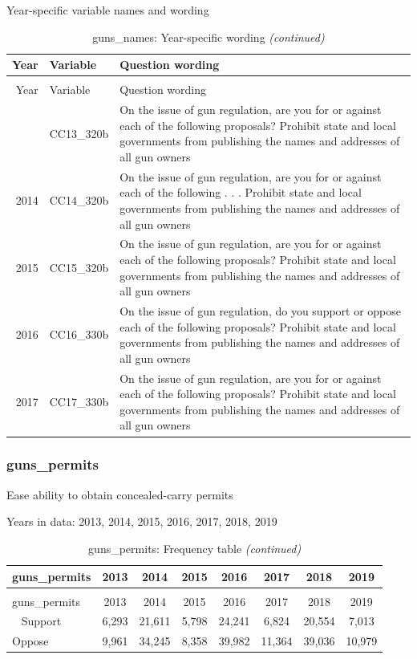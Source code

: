 \documentclass[12pt]{article}
\begin{document}
Year-specific variable names and wording

\begin{longtable}[t]{rl>{\raggedright\arraybackslash}p{10cm}}
\caption{\label{tab:unnamed-chunk-4}guns\_names: Year-specific wording}\\
\toprule
Year & Variable & Question wording\\
\midrule
\endfirsthead
\caption[]{guns\_names: Year-specific wording \textit{(continued)}}\\
\toprule
Year & Variable & Question wording\\
\midrule
\endhead
\
\endfoot
\bottomrule
\endlastfoot
2013 & CC13\_320b & On the issue of gun regulation, are you for or against each of the following proposals? Prohibit state and local governments from publishing the names and addresses of all gun owners\\
2014 & CC14\_320b & On the issue of gun regulation, are you for or against each of the following . . . Prohibit state and local governments from publishing the names and addresses of all gun owners\\
2015 & CC15\_320b & On the issue of gun regulation, are you for or against each of the following proposals? Prohibit state and local governments from publishing the names and addresses of all gun owners\\
2016 & CC16\_330b & On the issue of gun regulation, do you support or oppose each of the following proposals? Prohibit state and local governments from publishing the names and addresses of all gun owners\\
2017 & CC17\_330b & On the issue of gun regulation, are you for or against each of the following proposals? Prohibit state and local governments from publishing the names and addresses of all gun owners\\*
\end{longtable}

\subsubsection{guns\_permits}\label{guns_permits}

Ease ability to obtain concealed-carry permits

Years in data: 2013, 2014, 2015, 2016, 2017, 2018, 2019

\begin{longtable}[t]{lccccccc}
\caption{\label{tab:unnamed-chunk-4}guns\_permits: Frequency table}\\
\toprule
guns\_permits & 2013 & 2014 & 2015 & 2016 & 2017 & 2018 & 2019\\
\midrule
\endfirsthead
\caption[]{guns\_permits: Frequency table \textit{(continued)}}\\
\toprule
guns\_permits & 2013 & 2014 & 2015 & 2016 & 2017 & 2018 & 2019\\
\midrule
\endhead
\
\endfoot
\bottomrule
\endlastfoot
Support & 6,293 & 21,611 & 5,798 & 24,241 & 6,824 & 20,554 & 7,013\\
Oppose & 9,961 & 34,245 & 8,358 & 39,982 & 11,364 & 39,036 & 10,979\\*
\end{longtable}
\end{document}

